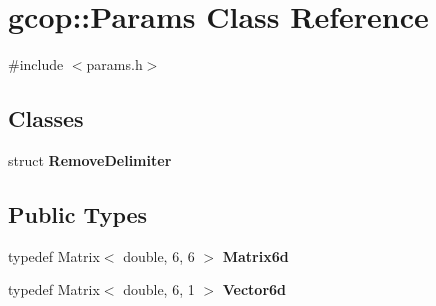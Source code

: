 \section{gcop\-:\-:\-Params \-Class \-Reference}
\label{classgcop_1_1Params}


{\ttfamily \#include $<$params.\-h$>$}

\subsection*{\-Classes}
\begin{DoxyCompactItemize}
\item 
struct {\bf \-Remove\-Delimiter}
\end{DoxyCompactItemize}
\subsection*{\-Public \-Types}
\begin{DoxyCompactItemize}
\item 
typedef \-Matrix$<$ double, 6, 6 $>$ {\bf \-Matrix6d}
\item 
typedef \-Matrix$<$ double, 6, 1 $>$ {\bf \-Vector6d}
\end{DoxyCompactItemize}
